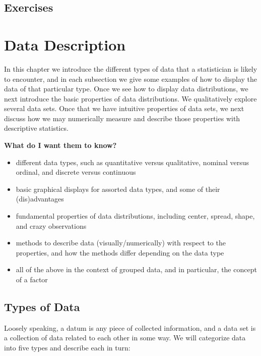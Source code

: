 \documentclass[]{book}
\providecommand{\tightlist}{%
  \setlength{\itemsep}{0pt}\setlength{\parskip}{0pt}}
\numberwithin{equation}{chapter}
\numberwithin{figure}{chapter}
\theoremstyle{plain}
\theoremstyle{definition}
\theoremstyle{remark}
\theoremstyle{definition}
\theoremstyle{definition}
\theoremstyle{remark}
\begin{document}
\newpage{}

\section{Exercises}\label{exercises}

\chapter{Data Description}\label{cha-describing-data-distributions}

In this chapter we introduce the different types of data that a
statistician is likely to encounter, and in each subsection we give some
examples of how to display the data of that particular type. Once we see
how to display data distributions, we next introduce the basic
properties of data distributions. We qualitatively explore several data
sets. Once that we have intuitive properties of data sets, we next
discuss how we may numerically measure and describe those properties
with descriptive statistics.

\textbf{What do I want them to know?}

\begin{itemize}
\tightlist
\item
  different data types, such as quantitative versus qualitative, nominal
  versus ordinal, and discrete versus continuous
\item
  basic graphical displays for assorted data types, and some of their
  (dis)advantages
\item
  fundamental properties of data distributions, including center,
  spread, shape, and crazy observations
\item
  methods to describe data (visually/numerically) with respect to the
  properties, and how the methods differ depending on the data type
\item
  all of the above in the context of grouped data, and in particular,
  the concept of a factor
\end{itemize}

\section{Types of Data}\label{sec-types-of-data}

Loosely speaking, a datum is any piece of collected information, and a
data set is a collection of data related to each other in some way. We
will categorize data into five types and describe each in turn:
\end{document}
